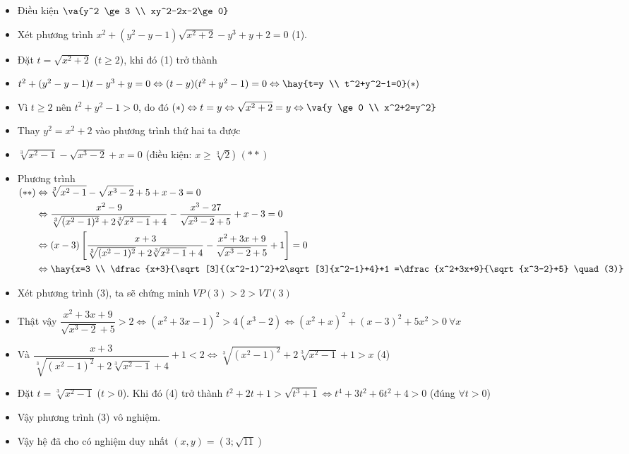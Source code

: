 \lgi 
\begin{itemize}[label=,leftmargin=*]
\item Điều kiện $\va{y^2 \ge 3 \\ xy^2-2x-2\ge 0}$
\item Xét phương trình $x^2+(y^2-y-1)\sqrt{x^2+2}-y^3+y+2=0$ (1).
\item Đặt $t=\sqrt{x^2+2}$ ($t\ge 2$), khi đó (1) trở thành 
\item $t^2+(y^2-y-1)t-y^3+y=0\Leftrightarrow (t-y)(t^2+y^2-1)=0\Leftrightarrow \hay{t=y \\ t^2+y^2-1=0} (*)$
\item Vì $t\ge 2$ nên $t^2+y^2-1>0$, do đó $(*)\Leftrightarrow t=y	\Leftrightarrow \sqrt{x^2+2}=y \Leftrightarrow \va{y \ge 0 \\ x^2+2=y^2}$
\item Thay $y^2=x^2+2$ vào phương trình thứ hai ta được 
\item $\sqrt[3]{x^2-1}-\sqrt{x^3-2}+x=0$ (điều kiện: $x\ge \sqrt[3]{2}$) $(**)$
\item Phương trình $\begin{aligned}[t](**)&\Leftrightarrow \sqrt[3]{x^2-1}-\sqrt{x^3-2}+5+x-3=0 \\
&\Leftrightarrow \dfrac{x^2-9}{\sqrt[3]{(x^2-1)^2}+2\sqrt[3]{x^2-1}+4}-\dfrac{x^3-27}{\sqrt{x^3-2}+5}+x-3=0 \\
&\Leftrightarrow (x-3)\left[\dfrac{x+3}{\sqrt[3]{(x^2-1)^2}+2\sqrt[3]{x^2-1}+4}-\dfrac{x^2+3x+9}{\sqrt{x^3-2}+5}+1 \right]=0 \\
&\Leftrightarrow \hay{x=3 \\ \dfrac{x+3}{\sqrt[3]{(x^2-1)^2}+2\sqrt[3]{x^2-1}+4}+1 =\dfrac{x^2+3x+9}{\sqrt{x^3-2}+5} \quad (3)}
 \end{aligned}$
\item Xét phương trình (3), ta sẽ chứng minh $VP(3)>2>VT(3)$
\item Thật vậy $\dfrac{x^2+3x+9}{\sqrt{x^3-2}+5}>2 \Leftrightarrow (x^2+3x-1)^2>4(x^3-2) \Leftrightarrow (x^2+x)^2+(x-3)^2+5x^2>0 \ \forall x$
\item Và $\dfrac{x+3}{\sqrt[3]{(x^2-1)^2}+2\sqrt[3]{x^2-1}+4}+1<2 \Leftrightarrow \sqrt[3]{(x^2-1)^2}+2\sqrt[3]{x^2-1}+1 >x $ (4)
\item Đặt $t=\sqrt[3]{x^2-1}$ ($t>0$). Khi đó (4) trở thành $t^2+2t+1>\sqrt{t^3+1}\Leftrightarrow t^4+3t^2+6t^2+4>0$ (đúng $\forall t>0$)
\item Vậy phương trình (3) vô nghiệm.
\item Vậy hệ đã cho có nghiệm duy nhất $(x,y)=(3;\sqrt{11})$
\end{itemize}


